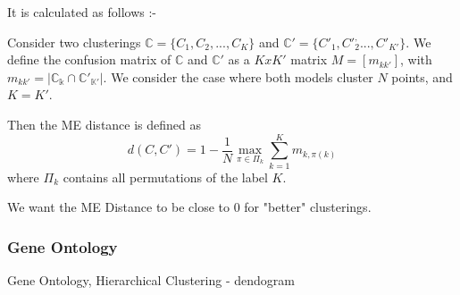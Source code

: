 It is calculated as follows :-

Consider two clusterings $\mathbb{C} =\{C_1,C_2,...,C_K\}$ and $\mathbb{C'} =\{C'_1,C'_2^,...,C'_{K'}\}$. 
We define the confusion matrix of $\mathbb{C}$ and $\mathbb{C'}$ as a $K x K'$ matrix $M=[m_{kk'}]$, with $m_{kk'} = |\mathbb{C_k} \cap \mathbb{C'_{K'}}|$. We consider the case where both models cluster $N$ points, and $K=K'$. 

Then the ME distance is defined as
\begin{equation*}
    d(C,C') = 1 - \frac{1}{N} \max_{\pi \in \Pi_k} \sum_{k=1}^{K} {m_{k,\pi(k)}}
\end{equation*}
where $\Pi_k$ contains all permutations of the label $K$.

We want the ME Distance to be close to 0 for "better" clusterings.
\subsubsection{Gene Ontology}
Gene Ontology, Hierarchical Clustering - dendogram